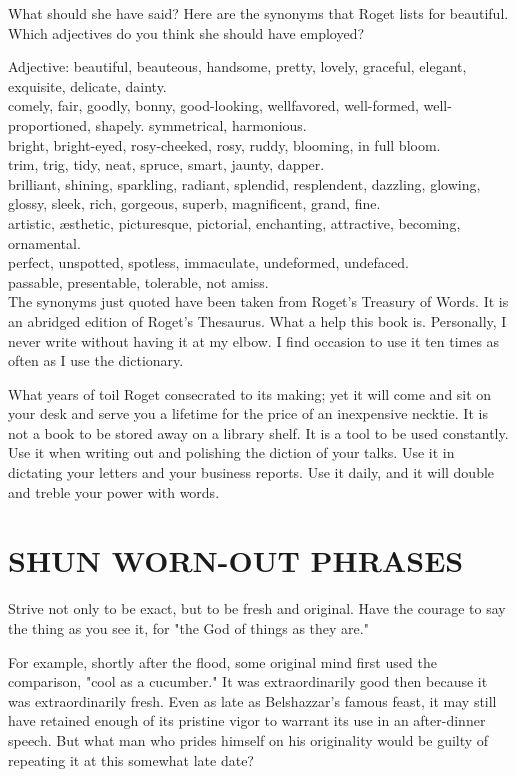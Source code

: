 \documentclass[10pt]{article}
\begin{document}
What should she have said? Here are the synonyms that Roget lists for beautiful. Which adjectives do you think she should have employed?

Adjective: beautiful, beauteous, handsome, pretty, lovely, graceful, elegant, exquisite, delicate, dainty.\\
comely, fair, goodly, bonny, good-looking, wellfavored, well-formed, well-proportioned, shapely. symmetrical, harmonious.\\
bright, bright-eyed, rosy-cheeked, rosy, ruddy, blooming, in full bloom.\\
trim, trig, tidy, neat, spruce, smart, jaunty, dapper.\\
brilliant, shining, sparkling, radiant, splendid, resplendent, dazzling, glowing, glossy, sleek, rich, gorgeous, superb, magnificent, grand, fine.\\
artistic, æsthetic, picturesque, pictorial, enchanting, attractive, becoming, ornamental.\\
perfect, unspotted, spotless, immaculate, undeformed, undefaced.\\
passable, presentable, tolerable, not amiss.\\
The synonyms just quoted have been taken from Roget's Treasury of Words. It is an abridged edition of Roget's Thesaurus. What a help this book is. Personally, I never write without having it at my elbow. I find occasion to use it ten times as often as I use the dictionary.

What years of toil Roget consecrated to its making; yet it will come and sit on your desk and serve you a lifetime for the price of an inexpensive necktie. It is not a book to be stored away on a library shelf. It is a tool to be used constantly. Use it when writing out and polishing the diction of your talks. Use it in dictating your letters and your business reports. Use it daily, and it will double and treble your power with words.

\section*{SHUN WORN-OUT PHRASES}
Strive not only to be exact, but to be fresh and original. Have the courage to say the thing as you see it, for "the God of things as they are."

For example, shortly after the flood, some original mind first used the comparison, "cool as a cucumber." It was extraordinarily good then because it was extraordinarily fresh. Even as late as Belshazzar's famous feast, it may still have retained enough of its pristine vigor to warrant its use in an after-dinner speech. But what man who prides himself on his originality would be guilty of repeating it at this somewhat late date?
\end{document}
